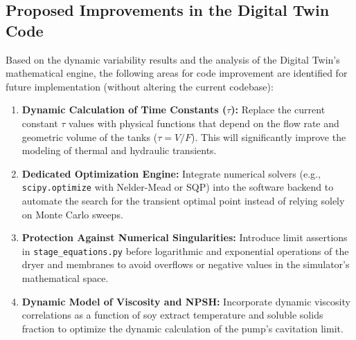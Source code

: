 \documentclass[10pt,letterpaper,twocolumn]{article}
\begin{document}
\subsection{Proposed Improvements in the Digital Twin Code}

Based on the dynamic variability results and the analysis of the Digital Twin's mathematical engine, the following areas for code improvement are identified for future implementation (without altering the current codebase):
\begin{enumerate}
    \item \textbf{Dynamic Calculation of Time Constants ($\tau$):} Replace the current constant $\tau$ values with physical functions that depend on the flow rate and geometric volume of the tanks ($\tau = V / F$). This will significantly improve the modeling of thermal and hydraulic transients.
    \item \textbf{Dedicated Optimization Engine:} Integrate numerical solvers (e.g., \texttt{scipy.optimize} with Nelder-Mead or SQP) into the software backend to automate the search for the transient optimal point instead of relying solely on Monte Carlo sweeps.
    \item \textbf{Protection Against Numerical Singularities:} Introduce limit assertions in \texttt{stage\_equations.py} before logarithmic and exponential operations of the dryer and membranes to avoid overflows or negative values in the simulator's mathematical space.
    \item \textbf{Dynamic Model of Viscosity and NPSH:} Incorporate dynamic viscosity correlations as a function of soy extract temperature and soluble solids fraction to optimize the dynamic calculation of the pump's cavitation limit.
\end{enumerate}
\end{document}
